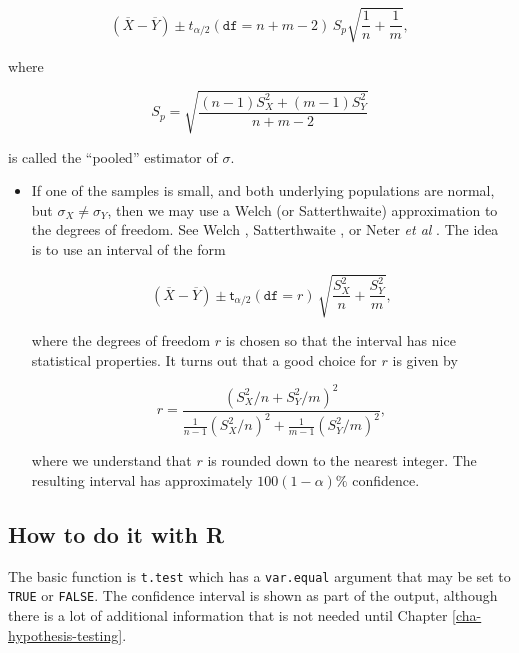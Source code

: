 \documentclass[]{book}
\providecommand{\tightlist}{%
  \setlength{\itemsep}{0pt}\setlength{\parskip}{0pt}}
\numberwithin{equation}{chapter}
\numberwithin{figure}{chapter}
\theoremstyle{plain}
\theoremstyle{definition}
\theoremstyle{remark}
\theoremstyle{definition}
\theoremstyle{definition}
\theoremstyle{remark}
\begin{document}
\begin{itemize}
  \begin{equation}
    \left(\overline{X}-\overline{Y}\right)\pm t_{\alpha/2}(\mathtt{df}=n+m-2)\, S_{p}\sqrt{\frac{1}{n}+\frac{1}{m}},
    \end{equation}

  where

  \begin{equation}
    S_{p}=\sqrt{\frac{(n-1)S_{X}^{2}+(m-1)S_{Y}^{2}}{n+m-2}}
    \end{equation}

  is called the ``pooled'' estimator of \(\sigma\).

  \begin{itemize}
  \tightlist
  \item
    If one of the samples is small, and both underlying populations are
    normal, but \(\sigma_{X}\neq\sigma_{Y}\), then we may use a Welch
    (or Satterthwaite) approximation to the degrees of freedom. See
    Welch \autocite{Welch1947}, Satterthwaite
    \autocite{Satterthwaite1946}, or Neter \emph{et al}
    \autocite{Neter1996}. The idea is to use an interval of the form

    \begin{equation}
      \left(\overline{X}-\overline{Y}\right)\pm\mathsf{t}_{\alpha/2}(\mathtt{df}=r)\,\sqrt{\frac{S_{X}^{2}}{n}+\frac{S_{Y}^{2}}{m}},
      \end{equation}

    where the degrees of freedom \(r\) is chosen so that the interval
    has nice statistical properties. It turns out that a good choice for
    \(r\) is given by

    \begin{equation}
      r=\frac{\left(S_{X}^{2}/n+S_{Y}^{2}/m\right)^{2}}{\frac{1}{n-1}\left(S_{X}^{2}/n\right)^{2}+\frac{1}{m-1}\left(S_{Y}^{2}/m\right)^{2}},
      \end{equation}

    where we understand that \(r\) is rounded down to the nearest
    integer. The resulting interval has approximately
    \(100(1-\alpha)\%\) confidence.
  \end{itemize}
\end{itemize}

\subsection{How to do it with R}\label{how-to-do-it-with-r-34}

The basic function is \texttt{t.test} which has a \texttt{var.equal}
argument that may be set to \texttt{TRUE} or \texttt{FALSE}. The
confidence interval is shown as part of the output, although there is a
lot of additional information that is not needed until Chapter
\ref{cha-hypothesis-testing}.
\end{document}
